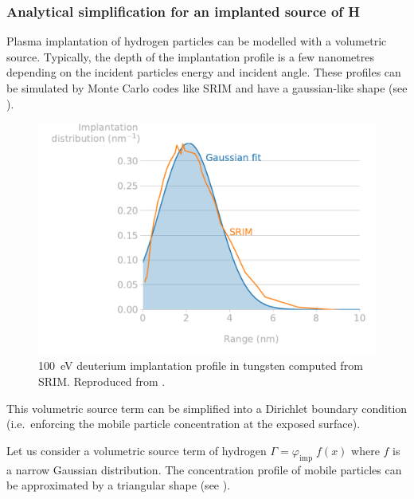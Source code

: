 \subsubsection{Analytical simplification for an implanted source of H} 

Plasma implantation of hydrogen particles can be modelled with a volumetric source.
Typically, the depth of the implantation profile is a few nanometres depending on the incident particles energy and incident angle.
These profiles can be simulated by Monte Carlo codes like SRIM  and have a gaussian-like shape  (see ).

\begin{figure}
    \centering
    \includegraphics[width=\linewidth]{Figures/Chapter1/srim_implantation_range.pdf}
    \caption{\SI{100}{eV} deuterium implantation profile in tungsten computed from SRIM. Reproduced from \cite{shimada_improved_2019}.}
\end{figure}

This volumetric source term can be simplified into a Dirichlet boundary condition (i.e.\ enforcing the mobile particle concentration at the exposed surface).

Let us consider a volumetric source term of hydrogen $\Gamma = \varphi_\mathrm{imp} \; f(x)$ where $f$ is a narrow Gaussian distribution.
The concentration profile of mobile particles can be approximated by a triangular shape  (see ).

